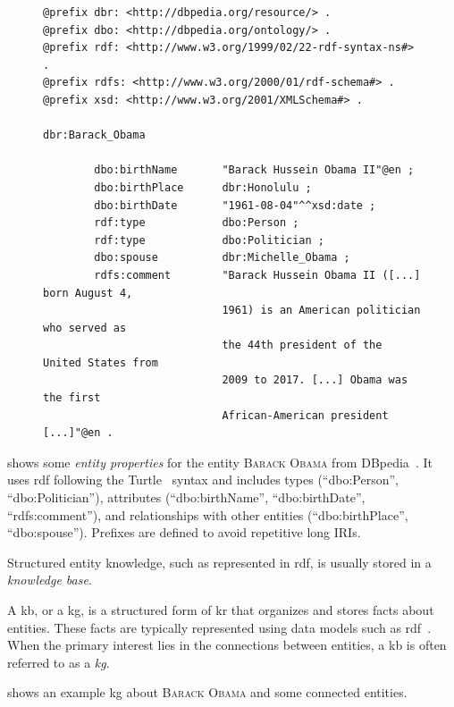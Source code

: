 \begin{figure}[h]
\centering
\begin{lstlisting}[style=rdfstyle,caption={Excerpt from the DBpedia~\cite{dbpedia,lehmann2015dbpedia,dbpedua_bizer_2009,dbpedia_auer_nucleus_2007} knowledge base entry of \textsc{Barack Obama}, in Turtle format~\cite{prudhommeaux2014turtle}.},label={lis:obama}]
@prefix dbr: <http://dbpedia.org/resource/> .
@prefix dbo: <http://dbpedia.org/ontology/> .
@prefix rdf: <http://www.w3.org/1999/02/22-rdf-syntax-ns#> .
@prefix rdfs: <http://www.w3.org/2000/01/rdf-schema#> .
@prefix xsd: <http://www.w3.org/2001/XMLSchema#> .

dbr:Barack_Obama

        dbo:birthName       "Barack Hussein Obama II"@en ;
        dbo:birthPlace      dbr:Honolulu ;
        dbo:birthDate       "1961-08-04"^^xsd:date ;
        rdf:type            dbo:Person ;
        rdf:type            dbo:Politician ;
        dbo:spouse          dbr:Michelle_Obama ;
        rdfs:comment        "Barack Hussein Obama II ([...] born August 4,
                            1961) is an American politician who served as
                            the 44th president of the United States from
                            2009 to 2017. [...] Obama was the first
                            African-American president [...]"@en .

\end{lstlisting}
\end{figure}

 shows some \emph{entity properties} for the entity \textsc{Barack Obama} from DBpedia~\cite{dbpedia,lehmann2015dbpedia,dbpedua_bizer_2009,dbpedia_auer_nucleus_2007}. It uses \ac{rdf} following the Turtle~\cite{prudhommeaux2014turtle} syntax and includes types (``dbo:Person'', ``dbo:Politician''), attributes (``dbo:birthName'', ``dbo:birthDate'', ``rdfs:comment''), and relationships with other entities (``dbo:birthPlace'', ``dbo:spouse''). Prefixes are defined to avoid repetitive long IRIs.

Structured entity knowledge, such as represented in \ac{rdf}, is usually stored in a \emph{knowledge base}.
%
\begin{definition}[\Acl{kb}]
    A \acf{kb}, or a \acf{kg}, is a structured form of \acl{kr} that organizes and stores facts about entities. 
    These facts are typically represented using data models such as \ac{rdf}~\cite{entityorientedsearch2018balog}.
    When the primary interest lies in the connections between entities, a \acl{kb} is often referred to as a \emph{\acl{kg}}.
\end{definition}
 shows an example \acl{kg} about \textsc{Barack Obama} and some connected entities.

